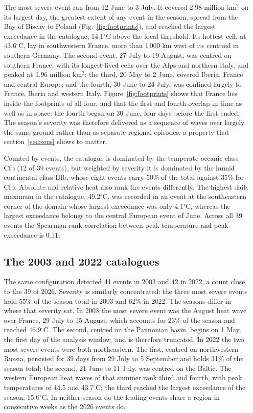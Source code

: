 \documentclass{amsdraft}
\begin{document}
The most severe event ran from 12 June to 3 July. It covered 2.98 million
km$^2$ on its largest day, the greatest extent of any event in the season,
spread from the Bay of Biscay to Poland (Fig.~\ref{fig:footprints}), and
reached the largest exceedance in the catalogue, 14.1$^\circ$C above the
local threshold. Its hottest cell, at 43.6$^\circ$C, lay in southwestern
France, more than 1\,000 km west of its centroid in southern Germany. The
second event, 27 July to 19 August, was centred on southern France,
with its longest-lived cells over the Alps and northern Italy, and peaked
at 1.96 million km$^2$; the third, 20 May to 2 June,
covered Iberia, France and central Europe; and the fourth, 30 June to
24 July, was confined largely to France, Iberia and western
Italy. Figure~\ref{fig:footprints} shows that France lies
inside the footprints of all four, and that the first and fourth overlap
in time as well as in space: the fourth began on 30 June, four days before
the first ended. The season's severity was therefore delivered as a
sequence of waves over largely the same ground rather than as separate
regional episodes, a property that section~\ref{sec:sens} shows to matter.

Counted by events, the catalogue is dominated by the temperate oceanic
class Cfb (12 of 39 events), but weighted by severity it is dominated by
the humid continental class Dfb, whose eight events carry 50\% of the
total against 35\% for Cfb. Absolute and relative heat also rank the
events differently. The highest daily maximum in the catalogue,
49.2$^\circ$C, was recorded in an event at the southeastern corner
of the domain whose largest exceedance was only 4.1$^\circ$C, whereas the
largest exceedance belongs to the central European event of June. Across
all 39 events the Spearman rank correlation between peak temperature and
peak exceedance is 0.11.

\subsection{The 2003 and 2022 catalogues}
\label{sec:cat_other}

The same configuration detected 41 events in 2003 and 42 in 2022, a count
close to the 39 of 2026. Severity is similarly concentrated: the three
most severe events hold 55\% of the season total in 2003 and 62\% in
2022. The seasons differ in where that severity sat. In 2003 the most
severe event was the August heat wave over France, 29 July to 15 August,
which accounts for 23\% of the season and reached 46.9$^\circ$C. The
second, centred on the Pannonian basin, begins on 1 May, the first day of
the analysis window, and is therefore truncated. In 2022 the two most
severe events were both northeastern. The first, centred on northwestern
Russia, persisted for 39 days from 29 July to 5 September and holds 31\%
of the season total; the second, 21 June to 11 July, was centred on the
Baltic. The western European heat waves of that summer rank third and
fourth, with peak temperatures of 44.5 and 43.7$^\circ$C; the third
reached the largest exceedance of the season, 15.0$^\circ$C. In neither
season do the leading events share a region in consecutive weeks as the
2026 events do.
\end{document}
